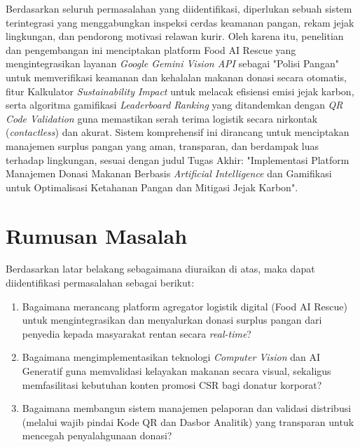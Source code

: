 Berdasarkan seluruh permasalahan yang diidentifikasi, diperlukan sebuah sistem terintegrasi yang menggabungkan inspeksi cerdas keamanan pangan, rekam jejak lingkungan, dan pendorong motivasi relawan kurir. Oleh karena itu, penelitian dan pengembangan ini menciptakan platform Food AI Rescue yang mengintegrasikan layanan \textit{Google Gemini Vision API} sebagai "Polisi Pangan" untuk memverifikasi keamanan dan kehalalan makanan donasi secara otomatis, fitur Kalkulator \textit{Sustainability Impact} untuk melacak efisiensi emisi jejak karbon, serta algoritma gamifikasi \textit{Leaderboard Ranking} yang ditandemkan dengan \textit{QR Code Validation} guna memastikan serah terima logistik secara nirkontak (\textit{contactless}) dan akurat. Sistem komprehensif ini dirancang untuk menciptakan manajemen surplus pangan yang aman, transparan, dan berdampak luas terhadap lingkungan, sesuai dengan judul Tugas Akhir: "Implementasi Platform Manajemen Donasi Makanan Berbasis \textit{Artificial Intelligence} dan Gamifikasi untuk Optimalisasi Ketahanan Pangan dan Mitigasi Jejak Karbon".
\section{Rumusan Masalah}
Berdasarkan latar belakang sebagaimana diuraikan di atas, maka dapat diidentifikasi permasalahan sebagai berikut:
\begin{enumerate}
    \item Bagaimana merancang platform agregator logistik digital (Food AI Rescue) untuk mengintegrasikan dan menyalurkan donasi surplus pangan dari penyedia kepada masyarakat rentan secara \textit{real-time}?
    \item Bagaimana mengimplementasikan teknologi \textit{Computer Vision} dan AI Generatif guna memvalidasi kelayakan makanan secara visual, sekaligus memfasilitasi kebutuhan konten promosi CSR bagi donatur korporat?
    \item Bagaimana membangun sistem manajemen pelaporan dan validasi distribusi (melalui wajib pindai Kode QR dan Dasbor Analitik) yang transparan untuk mencegah penyalahgunaan donasi?
\end{enumerate}

